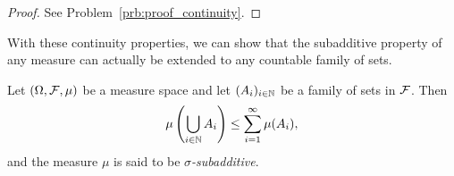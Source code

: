 \begin{proof}
See Problem~\ref{prb:proof_continuity}.
\end{proof}
%
%
%
%
%

With these continuity properties, we can show that the subadditive property of any measure can actually be extended to any countable family of sets.

\begin{lemma}\label{lem:sigma_subadditive}
Let $(\Omega, \mathcal F, \mu)$ be a measure space and let $(A_i)_{i \in \mathbb N}$ be a family of sets in $\mathcal F$. Then
\[
	\mu\left(\bigcup_{i \in \mathbb N} A_i\right) \le \sum_{i = 1}^\infty \mu(A_i),
\]
and the measure $\mu$ is said to be \emph{$\sigma$-subadditive}.
\end{lemma}

